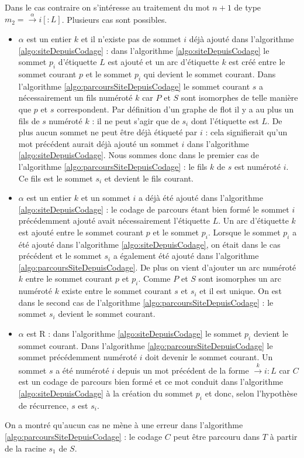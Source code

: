 \begin{pr}
Dans le cas contraire on s'intéresse au traitement du mot $n+1$ de type $m_2=\xrightarrow{\alpha}i[:L]$.
Plusieurs cas sont possibles.
\begin{itemize}
 \item $\alpha$ est un entier $k$ et il n'existe pas de sommet $i$ déjà ajouté dans l'algorithme \ref{algo:siteDepuisCodage} : dans l'algorithme \ref{algo:siteDepuisCodage} le sommet $p_i$ d'étiquette $L$ est ajouté et un arc d'étiquette $k$ est créé entre le sommet courant $p$ et le sommet $p_{i}$ qui devient le sommet courant.
 Dans l'algorithme \ref{algo:parcoursSiteDepuisCodage} le sommet courant $s$ a nécessairement un fils numéroté $k$ car $P$ et $S$ sont isomorphes de telle manière que $p$ et $s$ correspondent. Par définition d'un graphe de flot il y a au plus un fils de $s$ numéroté $k$ : il ne peut s'agir que de $s_i$ dont l'étiquette est $L$. De plus aucun sommet ne peut être déjà étiqueté par $i$ : cela signifierait qu'un mot précédent aurait déjà ajouté un sommet $i$ dans l'algorithme \ref{algo:siteDepuisCodage}.
 Nous sommes donc dans le premier cas de l'algorithme \ref{algo:parcoursSiteDepuisCodage} : le fils $k$ de $s$ est numéroté $i$. Ce fils est le sommet $s_i$ et devient le fils courant.
 \item $\alpha$ est un entier $k$ et un sommet $i$ a déjà été ajouté dans l'algorithme \ref{algo:siteDepuisCodage} : le codage de parcours étant bien formé le sommet $i$ précédemment ajouté avait nécessairement l'étiquette $L$. 
 Un arc d'étiquette $k$ est ajouté entre le sommet courant $p$ et le sommet $p_i$. Lorsque le sommet $p_i$ a été ajouté dans l'algorithme \ref{algo:siteDepuisCodage}, on était dans le cas précédent et le sommet $s_i$ a également été ajouté dans l'algorithme \ref{algo:parcoursSiteDepuisCodage}. De plus on vient d'ajouter un arc numéroté $k$ entre le sommet courant $p$ et $p_i$. 
 Comme $P$ et $S$ sont isomorphes un arc numéroté $k$ existe entre le sommet courant $s$ et $s_i$ et il est unique. On est dans le second cas de l'algorithme \ref{algo:parcoursSiteDepuisCodage} : le sommet $s_i$ devient le sommet courant.
 \item $\alpha$ est R : dans l'algorithme \ref{algo:siteDepuisCodage} le sommet $p_i$ devient le sommet courant. Dans l'algorithme \ref{algo:parcoursSiteDepuisCodage} le sommet précédemment numéroté $i$ doit devenir le sommet courant. Un sommet $s$ a été numéroté $i$ depuis un mot précédent de la forme $\xrightarrow{k}i:L$ car $C$ est un codage de parcours bien formé et ce mot conduit dans l'algorithme \ref{algo:siteDepuisCodage} à la création du sommet $p_i$ et donc, selon l'hypothèse de récurrence, $s$ est $s_i$.
\end{itemize}

On a montré qu'aucun cas ne mène à une erreur dans l'algorithme \ref{algo:parcoursSiteDepuisCodage} : le codage $C$ peut être parcouru dans $T$ à partir de la racine $s_1$ de $S$.
\end{pr}

